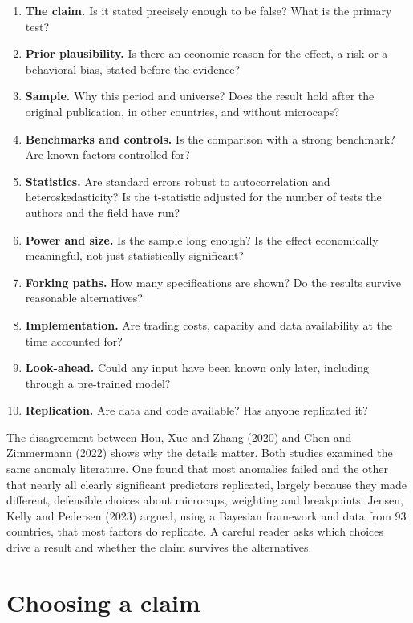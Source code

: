 \begin{enumerate}
  \item \textbf{The claim.} Is it stated precisely enough to be false? What is the primary test?
  \item \textbf{Prior plausibility.} Is there an economic reason for the effect, a risk or a behavioral bias, stated before the evidence?
  \item \textbf{Sample.} Why this period and universe? Does the result hold after the original publication, in other countries, and without microcaps?
  \item \textbf{Benchmarks and controls.} Is the comparison with a strong benchmark? Are known factors controlled for?
  \item \textbf{Statistics.} Are standard errors robust to autocorrelation and heteroskedasticity? Is the t-statistic adjusted for the number of tests the authors and the field have run?
  \item \textbf{Power and size.} Is the sample long enough? Is the effect economically meaningful, not just statistically significant?
  \item \textbf{Forking paths.} How many specifications are shown? Do the results survive reasonable alternatives?
  \item \textbf{Implementation.} Are trading costs, capacity and data availability at the time accounted for?
  \item \textbf{Look-ahead.} Could any input have been known only later, including through a pre-trained model?
  \item \textbf{Replication.} Are data and code available? Has anyone replicated it?
\end{enumerate}

The disagreement between Hou, Xue and Zhang (2020) and Chen and Zimmermann (2022) shows why the details matter. Both studies examined the same anomaly literature. One found that most anomalies failed and the other that nearly all clearly significant predictors replicated, largely because they made different, defensible choices about microcaps, weighting and breakpoints. Jensen, Kelly and Pedersen (2023) argued, using a Bayesian framework and data from 93 countries, that most factors do replicate. A careful reader asks which choices drive a result and whether the claim survives the alternatives.

\section{Choosing a claim}
\label{sec:24-choosing}

